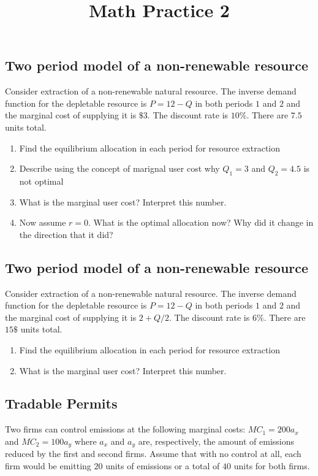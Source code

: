 \documentclass[11pt]{article}
\title{Math Practice 2}
\begin{document}
\subsection*{Two period model of a non-renewable resource}

Consider extraction of a non-renewable natural resource. The inverse demand function for the depletable resource is $P = 12 - Q$ in both periods $1$ and $2$ and the marginal cost of supplying it is $\$3$. The discount rate is $10\%$. There are $7.5$ units total.

\begin{enumerate}
  \item Find the equilibrium allocation in each period for resource extraction

  \item Describe using the concept of marignal user cost why $Q_1 = 3$ and $Q_2 = 4.5$ is not optimal

  \item What is the marginal user cost? Interpret this number.

  \item Now assume $r = 0$. What is the optimal allocation now? Why did it change in the direction that it did?
\end{enumerate}

\subsection*{Two period model of a non-renewable resource}

Consider extraction of a non-renewable natural resource. The inverse demand function for the depletable resource is $P = 12 - Q$ in both periods $1$ and $2$ and the marginal cost of supplying it is $2 + Q/2$. The discount rate is $6\%$. There are $15\$$ units total.

\begin{enumerate}
  \item Find the equilibrium allocation in each period for resource extraction

  \item What is the marginal user cost? Interpret this number.
\end{enumerate}

\subsection*{Tradable Permits}

Two firms can control emissions at the following marginal costs: $MC_1 = 200 a_x$ and $MC_2 = 100 a_y$ where $a_x$ and $a_y$ are, respectively, the amount of emissions reduced by the first and second firms. Assume that with no control at all, each firm would be emitting $20$ units of emissions or a total of $40$ units for both firms.
\end{document}
